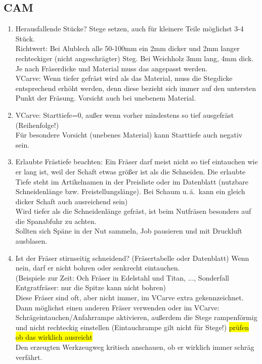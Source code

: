 \documentclass{\basedir/fablab-document}
\renewcommand{\todo}[1]{\colorbox{yellow}{{#1}}}
\begin{document}
\subsection{CAM}
\begin{enumerate}
	\item Herausfallende Stücke? Stege setzen, auch für kleinere Teile möglichst 3-4 Stück.\\Richtwert: Bei Alublech alle 50-100mm ein 2mm dicker und 2mm langer rechteckiger (nicht angeschrägter) Steg. Bei Weichholz 3mm lang, 4mm dick. Je nach Fräserdicke und Material muss das angepasst werden.\\
VCarve: Wenn tiefer gefräst wird als das Material, muss die Stegdicke entsprechend erhöht werden, denn diese bezieht sich immer auf den untersten Punkt der Fräsung. Vorsicht auch bei unebenem Material.
	\item VCarve: Starttiefe=0, außer wenn vorher mindestens so tief ausgefräst (Reihenfolge!)\\
Für besondere Vorsicht (unebenes Material) kann Starttiefe auch negativ sein.
	\item Erlaubte Frästiefe beachten: Ein Fräser darf meist nicht so tief eintauchen wie er lang ist, weil der Schaft etwas größer ist als die Schneiden. Die erlaubte Tiefe steht im Artikelnamen in der Preisliste oder im Datenblatt (nutzbare Schneidenlänge bzw. Freistellungslänge).
Bei Schaum u.\,ä.\  kann ein gleich dicker Schaft auch ausreichend sein) \\
Wird tiefer als die Schneidenlänge gefräst, ist beim Nutfräsen besonders auf die Spanabfuhr zu achten. \\
Sollten sich Späne in der Nut sammeln, Job pausieren und mit Druckluft ausblasen.
	\item Ist der Fräser stirnseitig schneidend? (Fräsertabelle oder Datenblatt) Wenn nein, darf er nicht bohren oder senkrecht eintauchen.\\
(Beispiele zur Zeit: Och Fräser in Edelstahl und Titan, ..., Sonderfall Entgratfräser: nur die Spitze kann nicht bohren)\\
Diese Fräser sind oft, aber nicht immer, im VCarve extra gekennzeichnet.\\
Dann möglichst einen anderen Fräser verwenden oder im VCarve: Schrägeintauchen/Anfahrrampe aktivieren, außerdem die Stege rampenförmig und nicht rechteckig einstellen (Eintauchrampe gilt nicht für Stege!)  \todo{prüfen ob das wirklich ausreicht}\\
Den erzeugten Werkzeugweg kritisch anschauen, ob er wirklich immer schräg verfährt.

\end{enumerate}
\end{document}
